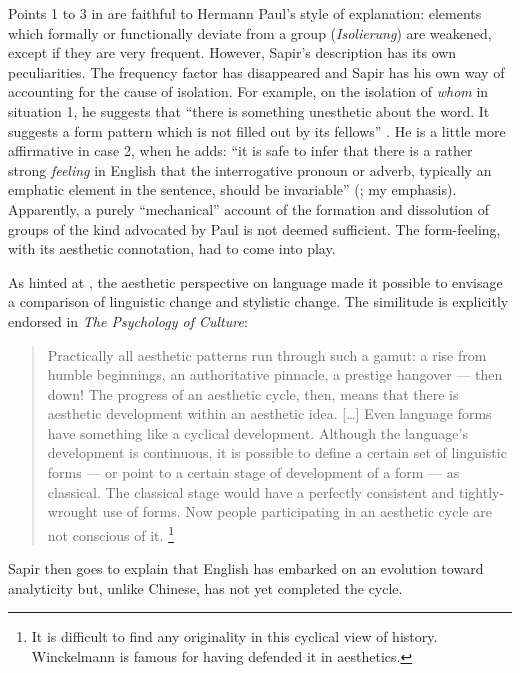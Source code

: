 \documentclass[output=paper]{langscibook}
\begin{document}
Points 1 to 3 in  are faithful to Hermann Paul's style of explanation: elements which formally or functionally deviate from a group (\emph{Isolierung}) are weakened, except if they are very frequent. However, Sapir's description has its own peculiarities. The frequency factor has disappeared and Sapir has his own way of accounting for the cause of isolation. For example, on the isolation of \emph{whom} in situation 1, he suggests that ``there is something unesthetic about the word. It suggests a form pattern which is not filled out by its fellows'' \citep[158]{Sapir1921}. He is a little more affirmative in case 2, when he adds: ``it is safe to infer that there is a rather strong \emph{feeling} in English that the interrogative pronoun or adverb, typically an emphatic element in the sentence, should be invariable'' (\citealt[159]{Sapir1921}; my emphasis). Apparently, a purely ``mechanical'' account of the formation and dissolution of groups of the kind advocated by Paul is not deemed sufficient. The form-feeling, with its aesthetic connotation, had to come into play.

As hinted at , the aesthetic perspective on language made it possible to envisage a comparison of linguistic change and stylistic change. The similitude is explicitly endorsed in \emph{The Psychology of Culture}:

\begin{quotation}
Practically all aesthetic patterns run through such a gamut: a rise from humble beginnings, an authoritative pinnacle, a prestige hangover — then down! The progress of an aesthetic cycle, then, means that there is aesthetic development within an aesthetic idea. […] Even language forms have something like a cyclical development. Although the language's development is continuous, it is possible to define a certain set of linguistic forms — or point to a certain stage of development of a form — as classical. The classical stage would have a perfectly consistent and tightly-wrought use of forms. Now people participating in an aesthetic cycle are not conscious of it. \citep[132--133]{Sapir2002}\footnote{It is difficult to find any originality in this cyclical view of history. Winckelmann is famous for having defended it in aesthetics.} 
\end{quotation}

Sapir then goes to explain that English has embarked on an evolution toward analyticity but, unlike Chinese, has not yet completed the cycle.
\end{document}

